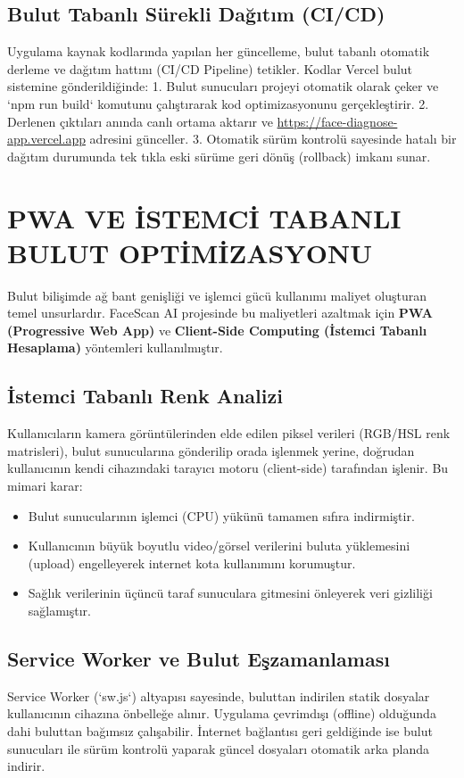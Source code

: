 \documentclass[12pt,a4paper]{article}
\begin{document}
\subsection{Bulut Tabanlı Sürekli Dağıtım (CI/CD)}
Uygulama kaynak kodlarında yapılan her güncelleme, bulut tabanlı otomatik derleme ve dağıtım hattını (CI/CD Pipeline) tetikler. Kodlar Vercel bulut sistemine gönderildiğinde:
1. Bulut sunucuları projeyi otomatik olarak çeker ve `npm run build` komutunu çalıştırarak kod optimizasyonunu gerçekleştirir.
2. Derlenen çıktıları anında canlı ortama aktarır ve \url{https://face-diagnose-app.vercel.app} adresini günceller.
3. Otomatik sürüm kontrolü sayesinde hatalı bir dağıtım durumunda tek tıkla eski sürüme geri dönüş (rollback) imkanı sunar.

\section{PWA VE İSTEMCİ TABANLI BULUT OPTİMİZASYONU}
Bulut bilişimde ağ bant genişliği ve işlemci gücü kullanımı maliyet oluşturan temel unsurlardır. FaceScan AI projesinde bu maliyetleri azaltmak için \textbf{PWA (Progressive Web App)} ve \textbf{Client-Side Computing (İstemci Tabanlı Hesaplama)} yöntemleri kullanılmıştır.

\subsection{İstemci Tabanlı Renk Analizi}
Kullanıcıların kamera görüntülerinden elde edilen piksel verileri (RGB/HSL renk matrisleri), bulut sunucularına gönderilip orada işlenmek yerine, doğrudan kullanıcının kendi cihazındaki tarayıcı motoru (client-side) tarafından işlenir. Bu mimari karar:
\begin{itemize}
    \item Bulut sunucularının işlemci (CPU) yükünü tamamen sıfıra indirmiştir.
    \item Kullanıcının büyük boyutlu video/görsel verilerini buluta yüklemesini (upload) engelleyerek internet kota kullanımını korumuştur.
    \item Sağlık verilerinin üçüncü taraf sunuculara gitmesini önleyerek veri gizliliği sağlamıştır.
\end{itemize}

\subsection{Service Worker ve Bulut Eşzamanlaması}
Service Worker (`sw.js`) altyapısı sayesinde, buluttan indirilen statik dosyalar kullanıcının cihazına önbelleğe alınır. Uygulama çevrimdışı (offline) olduğunda dahi buluttan bağımsız çalışabilir. İnternet bağlantısı geri geldiğinde ise bulut sunucuları ile sürüm kontrolü yaparak güncel dosyaları otomatik arka planda indirir.
\end{document}
